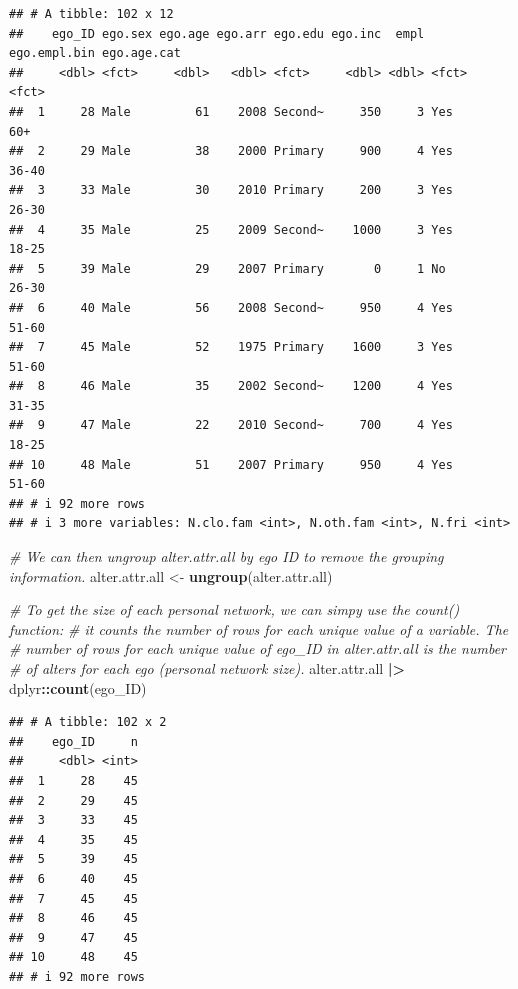 \documentclass[
]{book}
\newenvironment{Shaded}{\begin{snugshade}}{\end{snugshade}}
\newcommand{\CommentTok}[1]{\textcolor[rgb]{0.56,0.35,0.01}{\textit{#1}}}
\newcommand{\FunctionTok}[1]{\textcolor[rgb]{0.13,0.29,0.53}{\textbf{#1}}}
\newcommand{\NormalTok}[1]{#1}
\newcommand{\OtherTok}[1]{\textcolor[rgb]{0.56,0.35,0.01}{#1}}
\newcommand{\SpecialCharTok}[1]{\textcolor[rgb]{0.81,0.36,0.00}{\textbf{#1}}}
\begin{document}
\begin{verbatim}
## # A tibble: 102 x 12
##    ego_ID ego.sex ego.age ego.arr ego.edu ego.inc  empl ego.empl.bin ego.age.cat
##     <dbl> <fct>     <dbl>   <dbl> <fct>     <dbl> <dbl> <fct>        <fct>      
##  1     28 Male         61    2008 Second~     350     3 Yes          60+        
##  2     29 Male         38    2000 Primary     900     4 Yes          36-40      
##  3     33 Male         30    2010 Primary     200     3 Yes          26-30      
##  4     35 Male         25    2009 Second~    1000     3 Yes          18-25      
##  5     39 Male         29    2007 Primary       0     1 No           26-30      
##  6     40 Male         56    2008 Second~     950     4 Yes          51-60      
##  7     45 Male         52    1975 Primary    1600     3 Yes          51-60      
##  8     46 Male         35    2002 Second~    1200     4 Yes          31-35      
##  9     47 Male         22    2010 Second~     700     4 Yes          18-25      
## 10     48 Male         51    2007 Primary     950     4 Yes          51-60      
## # i 92 more rows
## # i 3 more variables: N.clo.fam <int>, N.oth.fam <int>, N.fri <int>
\end{verbatim}

\begin{Shaded}
\begin{Highlighting}[]
\CommentTok{\# We can then ungroup alter.attr.all by ego ID to remove the grouping information.}
\NormalTok{alter.attr.all }\OtherTok{\textless{}{-}} \FunctionTok{ungroup}\NormalTok{(alter.attr.all)}

\CommentTok{\# To get the size of each personal network, we can simpy use the count() function:}
\CommentTok{\# it counts the number of rows for each unique value of a variable. The}
\CommentTok{\# number of rows for each unique value of ego\_ID in alter.attr.all is the number}
\CommentTok{\# of alters for each ego (personal network size).}
\NormalTok{alter.attr.all }\SpecialCharTok{|\textgreater{}} 
\NormalTok{  dplyr}\SpecialCharTok{::}\FunctionTok{count}\NormalTok{(ego\_ID)}
\end{Highlighting}
\end{Shaded}

\begin{verbatim}
## # A tibble: 102 x 2
##    ego_ID     n
##     <dbl> <int>
##  1     28    45
##  2     29    45
##  3     33    45
##  4     35    45
##  5     39    45
##  6     40    45
##  7     45    45
##  8     46    45
##  9     47    45
## 10     48    45
## # i 92 more rows
\end{verbatim}
\end{document}

